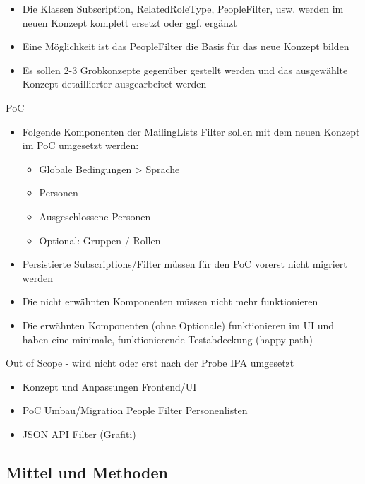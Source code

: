 \begin{itemize}
    \item Die Klassen Subscription, RelatedRoleType, PeopleFilter, usw. werden im neuen Konzept komplett ersetzt oder ggf. ergänzt
    \item Eine Möglichkeit ist das PeopleFilter die Basis für das neue Konzept bilden
    \item Es sollen 2-3 Grobkonzepte gegenüber gestellt werden und das ausgewählte Konzept detaillierter ausgearbeitet werden
\end{itemize}

PoC

\begin{itemize}
\item Folgende Komponenten der MailingLists Filter sollen mit dem neuen Konzept im PoC umgesetzt werden:
    \begin{itemize}
        \item Globale Bedingungen > Sprache
        \item Personen
        \item Ausgeschlossene Personen
        \item Optional: Gruppen / Rollen
    \end{itemize}    
\item Persistierte Subscriptions/Filter müssen für den PoC vorerst nicht migriert werden
\item Die nicht erwähnten Komponenten müssen nicht mehr funktionieren
\item Die erwähnten Komponenten (ohne Optionale) funktionieren im UI und haben eine minimale, funktionierende Testabdeckung (happy path)
\end{itemize}

Out of Scope - wird nicht oder erst nach der Probe IPA umgesetzt

\begin{itemize}
    \item Konzept und Anpassungen Frontend/UI
    \item PoC Umbau/Migration People Filter Personenlisten
    \item JSON API Filter (Grafiti)
\end{itemize}

\newpage

\subsection{Mittel und Methoden}

